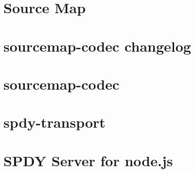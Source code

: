 \documentclass[twoside]{book}
\newcommand{\+}{\discretionary{\mbox{\scriptsize$\hookleftarrow$}}{}{}}
\begin{document}
\chapter{Source Map}
\label{md__c___users_vaishnavi_jadhav__desktop__developer_code_mean_stack_example_client_node_modules_source_map__r_e_a_d_m_e}

\chapter{sourcemap-\/codec changelog}
\label{md__c___users_vaishnavi_jadhav__desktop__developer_code_mean_stack_example_client_node_modules_s9f259023496638fa5c28ffed3b480c5d}

\chapter{sourcemap-\/codec}
\label{md__c___users_vaishnavi_jadhav__desktop__developer_code_mean_stack_example_client_node_modules_sourcemap_codec__r_e_a_d_m_e}

\chapter{spdy-\/transport}
\label{md__c___users_vaishnavi_jadhav__desktop__developer_code_mean_stack_example_client_node_modules_spdy_transport__r_e_a_d_m_e}

\chapter{SPDY Server for node.\+js}
\label{md__c___users_vaishnavi_jadhav__desktop__developer_code_mean_stack_example_client_node_modules_spdy__r_e_a_d_m_e}

\end{document}
